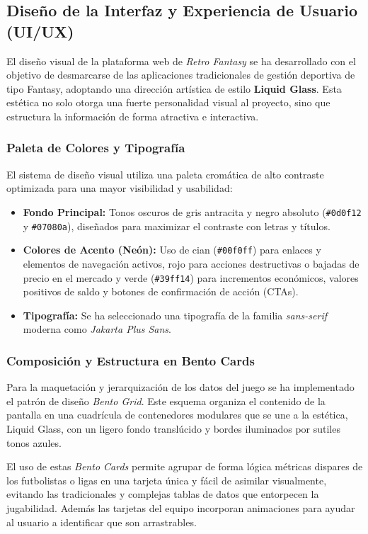 \subsection{Diseño de la Interfaz y Experiencia de Usuario (UI/UX)}
El diseño visual de la plataforma web de \textit{Retro Fantasy} se ha desarrollado con el objetivo de desmarcarse de las aplicaciones tradicionales de gestión deportiva de tipo Fantasy, adoptando una dirección artística de estilo \textbf{Liquid Glass}. Esta estética no solo otorga una fuerte personalidad visual al proyecto, sino que estructura la información de forma atractiva e interactiva.

\subsubsection{Paleta de Colores y Tipografía}
El sistema de diseño visual utiliza una paleta cromática de alto contraste optimizada para una mayor visibilidad y usabilidad:
\begin{itemize}
    \item \textbf{Fondo Principal:} Tonos oscuros de gris antracita y negro absoluto (\texttt{\#0d0f12} y \texttt{\#07080a}), diseñados para maximizar el contraste con letras y títulos.
    \item \textbf{Colores de Acento (Neón):} Uso de cian (\texttt{\#00f0ff}) para enlaces y elementos de navegación activos, rojo para acciones destructivas o bajadas de precio en el mercado y verde (\texttt{\#39ff14}) para incrementos económicos, valores positivos de saldo y botones de confirmación de acción (CTAs).
    \item \textbf{Tipografía:} Se ha seleccionado una tipografía de la familia \textit{sans-serif} moderna como \textit{Jakarta Plus Sans}.
\end{itemize}

\subsubsection{Composición y Estructura en Bento Cards}
Para la maquetación y jerarquización de los datos del juego se ha implementado el patrón de diseño \textit{Bento Grid}. Este esquema organiza el contenido de la pantalla en una cuadrícula de contenedores modulares que se une a la estética, Liquid Glass, con un ligero fondo translúcido y bordes iluminados por sutiles tonos azules. 

El uso de estas \textit{Bento Cards} permite agrupar de forma lógica métricas dispares de los futbolistas o ligas en una tarjeta única y fácil de asimilar visualmente, evitando las tradicionales y complejas tablas de datos que entorpecen la jugabilidad. Además las tarjetas del equipo incorporan animaciones para ayudar al usuario a identificar que son arrastrables.

